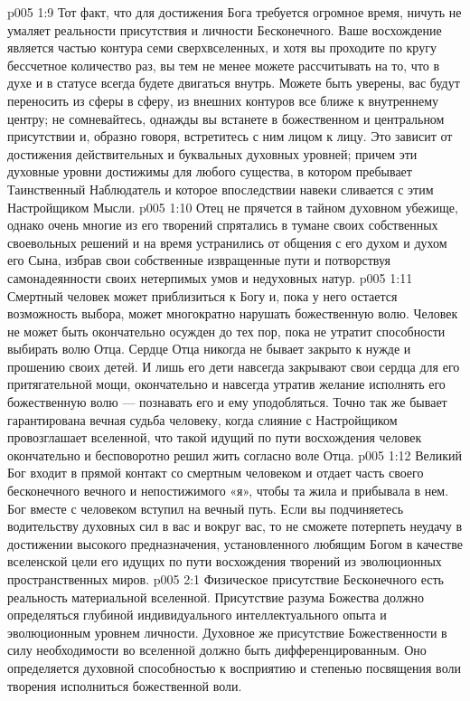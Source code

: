 \vs p005 1:9 Тот факт, что для достижения Бога требуется огромное время, ничуть не умаляет реальности присутствия и личности Бесконечного. Ваше восхождение является частью контура семи сверхвселенных, и хотя вы проходите по кругу бессчетное количество раз, вы тем не менее можете рассчитывать на то, что в духе и в статусе всегда будете двигаться внутрь. Можете быть уверены, вас будут переносить из сферы в сферу, из внешних контуров все ближе к внутреннему центру; не сомневайтесь, однажды вы встанете в божественном и центральном присутствии и, образно говоря, встретитесь с ним лицом к лицу. Это зависит от достижения действительных и буквальных духовных уровней; причем эти духовные уровни достижимы для любого существа, в котором пребывает Таинственный Наблюдатель и которое впоследствии навеки сливается с этим Настройщиком Мысли.
\vs p005 1:10 \pc Отец не прячется в тайном духовном убежище, однако очень многие из его творений спрятались в тумане своих собственных своевольных решений и на время устранились от общения с его духом и духом его Сына, избрав свои собственные извращенные пути и потворствуя самонадеянности своих нетерпимых умов и недуховных натур.
\vs p005 1:11 Смертный человек может приблизиться к Богу и, пока у него остается возможность выбора, может многократно нарушать божественную волю. Человек не может быть окончательно осужден до тех пор, пока не утратит способности выбирать волю Отца. Сердце Отца никогда не бывает закрыто к нужде и прошению своих детей. И лишь его дети навсегда закрывают свои сердца для его притягательной мощи, окончательно и навсегда утратив желание исполнять его божественную волю --- познавать его и ему уподобляться. Точно так же бывает гарантирована вечная судьба человеку, когда слияние с Настройщиком провозглашает вселенной, что такой идущий по пути восхождения человек окончательно и бесповоротно решил жить согласно воле Отца.
\vs p005 1:12 Великий Бог входит в прямой контакт со смертным человеком и отдает часть своего бесконечного вечного и непостижимого «я», чтобы та жила и прибывала в нем. Бог вместе с человеком вступил на вечный путь. Если вы подчиняетесь водительству духовных сил в вас и вокруг вас, то не сможете потерпеть неудачу в достижении высокого предназначения, установленного любящим Богом в качестве вселенской цели его идущих по пути восхождения творений из эволюционных пространственных миров.
\vs p005 2:1 Физическое присутствие Бесконечного есть реальность материальной вселенной. Присутствие разума Божества должно определяться глубиной индивидуального интеллектуального опыта и эволюционным уровнем личности. Духовное же присутствие Божественности в силу необходимости во вселенной должно быть дифференцированным. Оно определяется духовной способностью к восприятию и степенью посвящения воли творения исполниться божественной воли.
